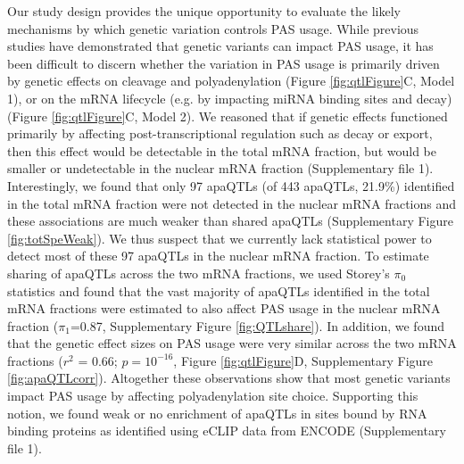 Our study design provides the unique opportunity to evaluate the likely mechanisms by which genetic variation controls PAS usage. While previous studies have demonstrated that genetic variants can impact PAS usage, it has been difficult to discern whether the variation in PAS usage is primarily driven by genetic effects on cleavage and polyadenylation (Figure \ref{fig:qtlFigure}C, Model 1), or on the mRNA lifecycle (e.g. by impacting miRNA binding sites and decay) (Figure \ref{fig:qtlFigure}C, Model 2). We reasoned that if genetic effects functioned primarily by affecting post-transcriptional regulation such as decay or export, then this effect would be detectable in the total mRNA fraction, but would be smaller or undetectable in the nuclear mRNA fraction (Supplementary file 1). Interestingly, we found that only 97 apaQTLs (of 443 apaQTLs, 21.9\%) identified in the total mRNA fraction were not detected in the nuclear mRNA fractions and these associations are much weaker than shared apaQTLs (Supplementary Figure \ref{fig:totSpeWeak}). We thus suspect that we currently lack statistical power to detect most of these 97 apaQTLs in the nuclear mRNA fraction. To estimate sharing of apaQTLs across the two mRNA fractions, we used Storey's $\pi_0$ statistics and found that the vast majority of apaQTLs identified in the total mRNA fractions were estimated to also affect PAS usage in the nuclear mRNA fraction ($\pi_{1}$=0.87, Supplementary Figure \ref{fig:QTLshare}). In addition, we found that the genetic effect sizes on PAS usage were very similar across the two mRNA fractions ($r^{2}$ = 0.66; $p = 10^{-16}$, Figure \ref{fig:qtlFigure}D, Supplementary Figure \ref{fig:apaQTLcorr}). Altogether these observations show that most genetic variants impact PAS usage by affecting polyadenylation site choice. Supporting this notion, we found weak or no enrichment of apaQTLs in sites bound by RNA binding proteins as identified using eCLIP data from ENCODE (Supplementary file 1).

